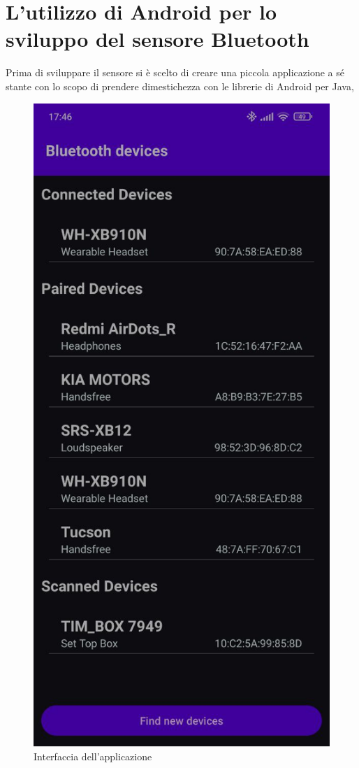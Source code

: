 \chapter{L'utilizzo di Android per lo sviluppo del sensore Bluetooth}
\label{chap:app-separata}
Prima di sviluppare il sensore si è scelto di creare una piccola applicazione a sé stante con lo scopo di prendere dimestichezza con le librerie di Android per Java,
\begin{figure}
    \centering
    \includegraphics[width=0.9\linewidth]{images/separate_app.png}
    \caption{Interfaccia dell'applicazione}
    \label{fig:separate_app}
\end{figure}
